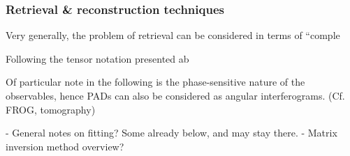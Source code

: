 \subsubsection{Retrieval \& reconstruction techniques}

Very generally, the problem of retrieval can be considered in terms of ``comple

Following the tensor notation presented ab

Of particular note in the following is the phase-sensitive nature of the observables, hence PADs can also be considered as angular interferograms. (Cf. FROG, tomography)

- General notes on fitting? Some already below, and may stay there.
- Matrix inversion method overview?